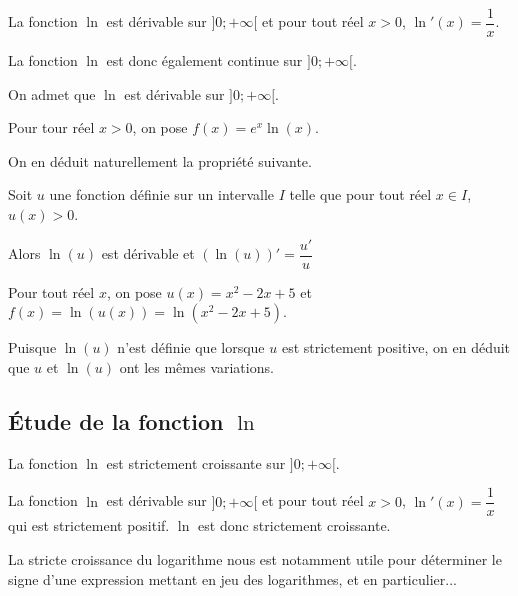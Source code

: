 \documentclass[11pt,fleqn, openany]{book} %
\begin{document}
\begin{proposition}La fonction $\ln$ est dérivable sur $]0;+\infty[$ et pour tout réel $x>0$, $\ln'(x)=\dfrac{1}{x}$.\end{proposition}

La fonction $\ln$ est donc également continue sur $]0;+\infty[$.

\begin{demonstration}[Au programme]On admet que $\ln$ est dérivable sur $]0;+\infty[$.


\vskip100pt
\end{demonstration}

\begin{example}Pour tour réel $x>0$, on pose $f(x)=e^x \ln(x)$.

\vskip100pt

\end{example}

On en déduit naturellement la propriété suivante.

\begin{proposition}Soit $u$ une fonction définie sur un intervalle $I$ telle que pour tout réel $x\in I$, $u(x)>0$. 

Alors $\ln(u)$ est dérivable et $(\ln(u))'=\dfrac{u'}{u}$\end{proposition}

\begin{example}Pour tout réel $x$, on pose $u(x)=x^2-2x+5$ et  $f(x)=\ln(u(x))=\ln(x^2-2x+5)$.
\vskip150pt
\end{example}

Puisque $\ln(u)$ n'est définie que lorsque $u$ est strictement positive, on en déduit que $u$ et $\ln(u)$ ont les mêmes variations.
\newpage
\subsection{Étude de la fonction $\ln$}

\begin{proposition}La fonction $\ln$ est strictement croissante sur $]0;+\infty [$.\end{proposition}

\begin{demonstration}La fonction $\ln$ est dérivable sur $]0;+\infty[$ et pour tout réel $x>0$, $\ln'(x)=\dfrac{1}{x}$ qui est strictement positif. $\ln$ est donc strictement croissante.\end{demonstration}

La stricte croissance du logarithme nous est notamment utile pour déterminer le signe d'une expression mettant en jeu des logarithmes, et en particulier...
\end{document}
